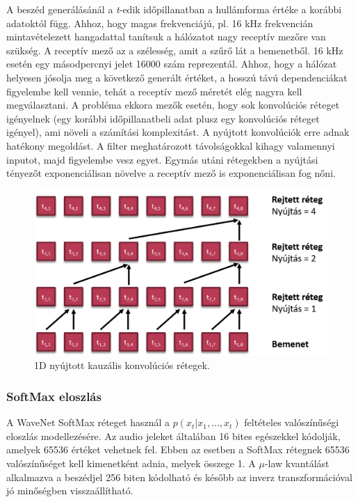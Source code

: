 A beszéd generálásánál a \emph{t}-edik időpillanatban a hullámforma értéke a korábbi adatoktól függ. Ahhoz, hogy magas frekvenciájú, pl. 16 kHz frekvencián mintavételezett 
hangadattal tanítsuk a hálózatot nagy receptív mezőre van szükség. A receptív mező az a szélesség, amit a szűrő lát a bemenetből. 16 kHz esetén egy másodpercnyi jelet 16000 szám reprezentál. Ahhoz, hogy a hálózat helyesen jósolja meg a következő generált értéket, a hosszú távú dependenciákat figyelembe kell vennie, tehát a receptív mező méretét elég nagyra kell megválasztani. A probléma ekkora mezők esetén, hogy sok konvolúciós réteget igényelnek (egy korábbi időpillanatbeli adat plusz egy konvolúciós réteget igényel), ami növeli a számítási komplexitást. A nyújtott konvolúciók erre adnak hatékony megoldást. A filter meghatározott távolságokkal kihagy valamennyi inputot, majd figyelembe vesz egyet. Egymás utáni rétegekben a nyújtási tényezőt exponenciálisan növelve a receptív mező is exponenciálisan fog nőni.

\begin{figure}[!ht]
	\centering
	\includegraphics[width=150mm, keepaspectratio]{figures/1d-dilated-conv.png}
	\caption{1D nyújtott kauzális konvolúciós rétegek.}
	\label{fig:1d_dilated_conv}
\end{figure}

\subsubsection{SoftMax eloszlás}
A WaveNet SoftMax réteget használ a $p(x_t|x_1,\dots,x_t)$ feltételes valószínűségi eloszlás modellezésére.
Az audio jeleket általában 16 bites egészekkel kódolják, amelyek 65536 értéket vehetnek fel. Ebben az esetben a SoftMax rétegnek 65536 valószínűséget kell kimenetként adnia, melyek összege 1. A $\mu$-law kvantálást alkalmazva a beszédjel 256 biten kódolható és később az inverz transzformációval jó minőségben visszaállítható.

